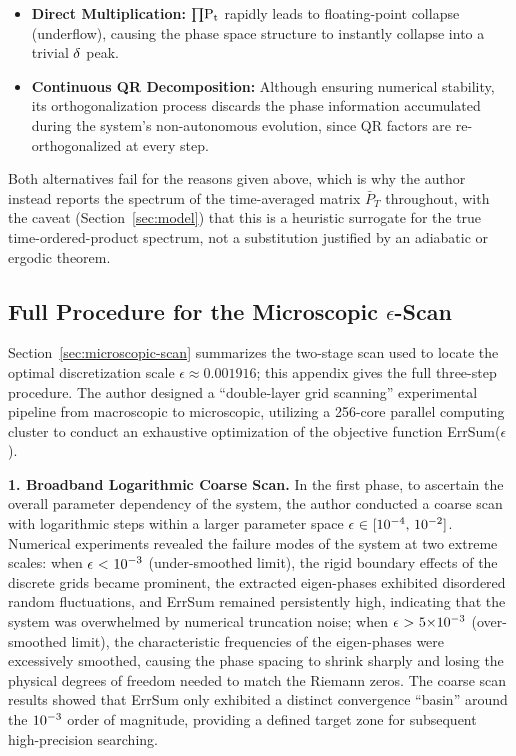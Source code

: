 \documentclass[mca,article,submit,oneauthor,pdftex]{Definitions/mdpi}
\begin{document}
\begin{itemize}
\item
  \textbf{Direct Multiplication:} \(\text{\ensuremath{\prod}}\text{P}_{\text{t}}\)
  rapidly leads to floating-point collapse (underflow), causing the
  phase space structure to instantly collapse into a trivial
  \(\text{\ensuremath{\delta}}\) peak.
\item
  \textbf{Continuous QR Decomposition:} Although ensuring numerical
  stability, its orthogonalization process discards the
  phase information accumulated during the system's
  non-autonomous evolution, since QR factors are re-orthogonalized at
  every step.
\end{itemize}

Both alternatives fail for the reasons given above, which is why the author
instead reports the spectrum of the time-averaged matrix $\bar P_T$
throughout, with the caveat (Section~\ref{sec:model}) that this is a
heuristic surrogate for the true time-ordered-product spectrum, not a
substitution justified by an adiabatic or ergodic theorem.

\subsection{Full Procedure for the Microscopic $\epsilon$-Scan}\label{sec:epsilon-scan-detail}

Section~\ref{sec:microscopic-scan} summarizes the two-stage scan used to
locate the optimal discretization scale $\epsilon\approx0.001916$; this
appendix gives the full three-step procedure. The author designed a
``double-layer grid scanning'' experimental pipeline from macroscopic to
microscopic, utilizing a 256-core parallel computing cluster to conduct an
exhaustive optimization of the objective function ErrSum($\epsilon$).

\textbf{1. Broadband Logarithmic Coarse Scan.} In the first phase, to
ascertain the overall parameter dependency of the system, the author
conducted a coarse scan with logarithmic steps within a larger parameter
space \(\text{\ensuremath{\epsilon}~\ensuremath{\in}~[}\text{10}^{\text{\ensuremath{-}4}}\text{,}~\text{10}^{\text{\ensuremath{-}2}}\text{]}\).
Numerical experiments revealed the failure modes of the system at two
extreme scales: when \(\text{\ensuremath{\epsilon}~<~}\text{10}^{\text{\ensuremath{-}3}}\)
(under-smoothed limit), the rigid boundary effects of the discrete grids
became prominent, the extracted eigen-phases exhibited disordered random
fluctuations, and ErrSum remained persistently high, indicating that the
system was overwhelmed by numerical truncation noise; when
\(\text{\ensuremath{\epsilon}~>~5\ensuremath{\times}}\text{10}^{\text{\ensuremath{-}3}}\)
(over-smoothed limit), the characteristic frequencies of the eigen-phases
were excessively smoothed, causing the phase spacing to shrink sharply and
losing the physical degrees of freedom needed to match the Riemann zeros.
The coarse scan results showed that ErrSum only exhibited a distinct
convergence ``basin'' around the \(\text{10}^{\text{\ensuremath{-}3}}\) order of
magnitude, providing a defined target zone for subsequent high-precision
searching.
\end{document}
